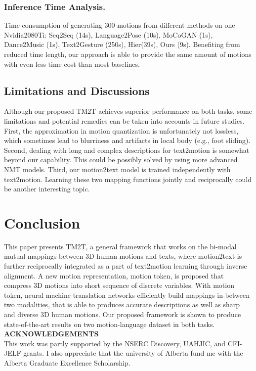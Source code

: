 \documentclass[runningheads]{llncs}
\newcommand{\beforesection}{\vspace{-2mm}}
\newcommand{\aftersection}{\vspace{-2mm}}
\newcommand{\beforesubsection}{\vspace{-2mm}}
\newcommand{\aftersubsection}{\vspace{-2mm}}
\newcommand{\beforesubsubsection}{\vspace{-5mm}}
\begin{document}
\beforesubsubsection
\subsubsection{Inference Time Analysis.} Time consumption of generating 300 motions from different methods on one Nvidia2080Ti: Seq2Seq (14s), Language2Pose (10s), MoCoGAN (1s), Dance2Music (1s), Text2Gesture (250s), Hier(39s), Ours (9s). Benefiting from reduced time length, our approach is able to provide the same amount of motions with even less time cost than most baselines.

\beforesubsection
\subsection{Limitations and Discussions}
\aftersubsection
Although our proposed TM2T achieves superior performance on both tasks, some limitations and potential remedies can be taken into accounts in future studies. First, the approximation in motion quantization is unfortunately not lossless, which sometimes lead to blurriness and artifacts in local body (e.g., foot sliding). Second, dealing with long and complex descriptions for text2motion is somewhat beyond our capability. This could be possibly solved by using more advanced NMT models. Third, our motion2text model is trained independently with text2motion. Learning these two mapping functions jointly and reciprocally could be another interesting topic.

\beforesection
\section{Conclusion}
\aftersection

This paper presents TM2T, a general framework that works on the bi-modal mutual mappings between 3D human motions and texts, where motion2text is further reciprocally integrated as a part of text2motion learning through inverse alignment. A new motion representation, motion token, is proposed that compress 3D motions into short sequence of discrete variables. With motion token, neural machine translation networks efficiently build mappings in-between two modalities, that is able to produces accurate descriptions as well as sharp and diverse 3D human motions. Our proposed framework is shown to produce state-of-the-art results on two motion-language dataset in both tasks.\\



\noindent\textbf{\small{ACKNOWLEDGEMENTS}}\\
This work was partly supported by the NSERC Discovery, UAHJIC, and CFI-JELF grants. I also appreciate that the university of Alberta fund me with the Alberta Graduate Excellence Scholarship.
\clearpage
\end{document}
